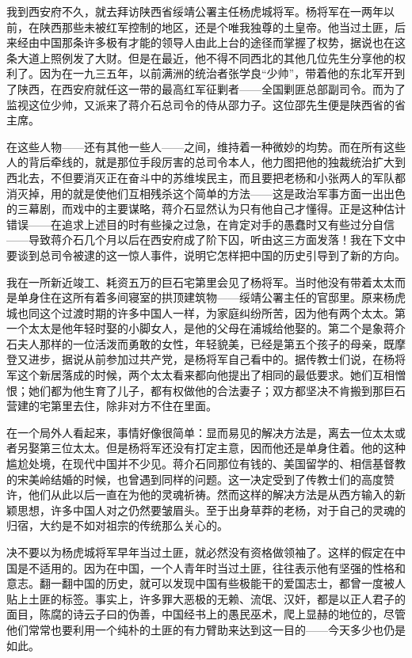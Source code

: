 \documentclass[10pt]{book}
\begin{document}
我到西安府不久，就去拜访陕西省绥靖公署主任杨虎城将军。杨将军在一两年以前，在陕西那些未被红军控制的地区，还是个唯我独尊的土皇帝。他当过土匪，后来经由中国那条许多极有才能的领导人由此上台的途径而掌握了权势，据说也在这条大道上照例发了大财。但是在最近，他不得不同西北的其他几位先生分享他的权利了。因为在一九三五年，以前满洲的统治者张学良“少帅”，带着他的东北军开到了陕西，在西安府就任这一带的最高红军征剿者——全国剿匪总部副司令。而为了监视这位少帅，又派来了蒋介石总司令的侍从邵力子。这位邵先生便是陕西省的省主席。

在这些人物——还有其他一些人——之间，维持着一种微妙的均势。而在所有这些人的背后牵线的，就是那位手段厉害的总司令本人，他力图把他的独裁统治扩大到西北去，不但要消灭正在奋斗中的苏维埃民主，而且要把老杨和小张两人的军队都消灭掉，用的就是使他们互相残杀这个简单的方法——这是政治军事方面一出出色的三幕剧，而戏中的主要谋略，蒋介石显然认为只有他自己才懂得。正是这种估计错误——在追求上述目的时有些操之过急，在肯定对手的愚蠢时又有些过分自信——导致蒋介石几个月以后在西安府成了阶下囚，听由这三方面发落！我在下文中要谈到总司令被逮的这一惊人事件，说明它怎样把中国的历史引导到了新的方向。

我在一所新近竣工、耗资五万的巨石宅第里会见了杨将军。当时他没有带着太太而是单身住在这所有着多间寝室的拱顶建筑物——绥靖公署主任的官邸里。原来杨虎城也同这个过渡时期的许多中国人一样，为家庭纠纷所苦，因为他有两个太太。第一个太太是他年轻时娶的小脚女人，是他的父母在浦城给他娶的。第二个是象蒋介石夫人那样的一位活泼而勇敢的女性，年轻貌美，已经是第五个孩子的母亲，既摩登又进步，据说从前参加过共产党，是杨将军自己看中的。据传教士们说，在杨将军这个新居落成的时候，两个太太看来都向他提出了相同的最低要求。她们互相憎恨；她们都为他生育了儿子，都有权做他的合法妻子；双方都坚决不肯搬到那巨石营建的宅第里去住，除非对方不住在里面。

在一个局外人看起来，事情好像很简单：显而易见的解决方法是，离去一位太太或者另娶第三位太太。但是杨将军还没有打定主意，因而他还是单身住着。他的这种尴尬处境，在现代中国并不少见。蒋介石同那位有钱的、美国留学的、相信基督教的宋美岭结婚的时候，也曾遇到同样的问题。这一决定受到了传教士们的高度赞许，他们从此以后一直在为他的灵魂祈祷。然而这样的解决方法是从西方输入的新颖思想，许多中国人对之仍然要皱眉头。至于出身草莽的老杨，对于自己的灵魂的归宿，大约是不如对祖宗的传统那么关心的。

决不要以为杨虎城将军早年当过土匪，就必然没有资格做领袖了。这样的假定在中国是不适用的。因为在中国，一个人青年时当过土匪，往往表示他有坚强的性格和意志。翻一翻中国的历史，就可以发现中国有些极能干的爱国志士，都曾一度被人贴上土匪的标签。事实上，许多罪大恶极的无赖、流氓、汉奸，都是以正人君子的面目，陈腐的诗云子曰的伪善，中国经书上的愚民巫术，爬上显赫的地位的，尽管他们常常也要利用一个纯朴的土匪的有力臂助来达到这一目的——今天多少也仍是如此。
\end{document}
